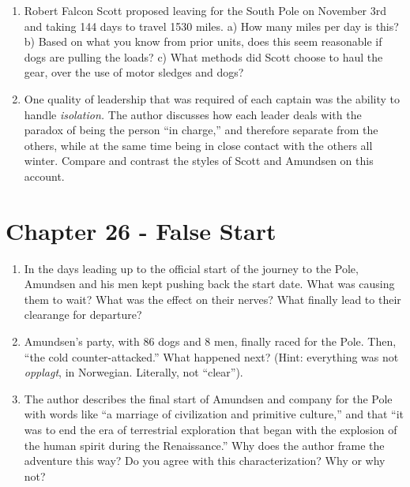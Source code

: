 \documentclass{article}
\begin{document}
\begin{enumerate}
\item Robert Falcon Scott proposed leaving for the South Pole on November 3rd and taking 144 days to travel 1530 miles.  a) How many miles per day is this?  b) Based on what you know from prior units, does this seem reasonable if dogs are pulling the loads?  c) What methods did Scott choose to haul the gear, over the use of motor sledges and dogs? \\ \vspace{2cm}
\item One quality of leadership that was required of each captain was the ability to handle \textit{isolation.}  The author discusses how each leader deals with the paradox of being the person ``in charge,'' and therefore separate from the others, while at the same time being in close contact with the others all winter.  Compare and contrast the styles of Scott and Amundsen on this account.  \\ \vspace{2cm}
\end{enumerate}

\section{Chapter 26 - False Start}
\begin{enumerate}
\item In the days leading up to the official start of the journey to the Pole, Amundsen and his men kept pushing back the start date.  What was causing them to wait?  What was the effect on their nerves?  What finally lead to their clearange for departure? \\ \vspace{2cm}
\item Amundsen's party, with 86 dogs and 8 men, finally raced for the Pole.  Then, ``the cold counter-attacked.''  What happened next?  (Hint: everything was not \textit{opplagt}, in Norwegian.  Literally, not ``clear''). \\ \vspace{2cm}
\item The author describes the final start of Amundsen and company for the Pole with words like ``a marriage of civilization and primitive culture,'' and that ``it was to end the era of terrestrial exploration that began with the explosion of the human spirit during the Renaissance.''  Why does the author frame the adventure this way?  Do you agree with this characterization?  Why or why not?  \\ \vspace{2cm}
\end{enumerate}
\end{document}
